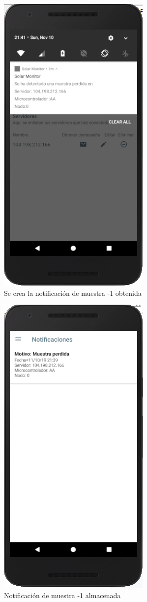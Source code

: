 \begin{figure}[H]
	\centering
	\includegraphics[scale=.7]{Capitulo5/images/muestra3.png}
	\caption{Se crea la notificación de muestra -1 obtenida}	
	\label{fig:muestra 3}
\end{figure} 

\begin{figure}[H]
	\centering
	\includegraphics[scale=.7]{Capitulo5/images/muestra4.png}
	\caption{Notificación de muestra -1 almacenada}	
	\label{fig:muestra 4}
\end{figure} 

